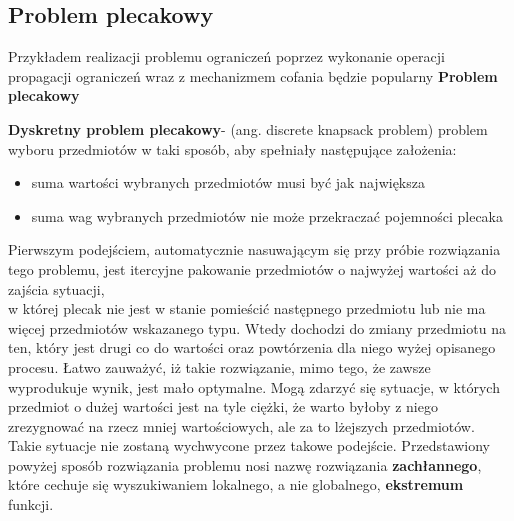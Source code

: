     \subsection{Problem plecakowy}
    Przykładem realizacji problemu ograniczeń poprzez wykonanie operacji propagacji ograniczeń wraz z mechanizmem cofania będzie popularny \textbf{Problem plecakowy}
    \begin{example}
        \textbf{Dyskretny problem plecakowy}- (ang. discrete knapsack problem) problem wyboru przedmiotów w taki sposób, aby spełniały następujące założenia:
        \begin{itemize}
            \item suma wartości wybranych przedmiotów musi być jak największa 
            \item suma wag wybranych przedmiotów nie może przekraczać pojemności plecaka
        \end{itemize}
    \end{example}

    Pierwszym podejściem, automatycznie nasuwającym się przy próbie rozwiązania tego problemu, 
    jest itercyjne pakowanie przedmiotów o najwyżej wartości aż do zajścia
    sytuacji, \\
    w której plecak nie jest w stanie pomieścić następnego przedmiotu lub nie ma więcej przedmiotów wskazanego typu. 
    Wtedy dochodzi do zmiany przedmiotu na ten, który jest 
    drugi co do wartości oraz powtórzenia dla niego wyżej opisanego procesu. Łatwo zauważyć, iż takie rozwiązanie, mimo tego, że zawsze wyprodukuje 
    wynik, jest mało optymalne. Mogą zdarzyć się sytuacje, w których przedmiot o dużej wartości jest na tyle ciężki, że warto byłoby z niego 
    zrezygnować na rzecz mniej wartościowych, ale za to lżejszych przedmiotów. Takie sytuacje nie zostaną wychwycone przez takowe podejście. 
    Przedstawiony powyżej sposób rozwiązania problemu nosi nazwę rozwiązania \textbf{zachłannego}, które cechuje się wyszukiwaniem lokalnego, a
    nie globalnego, \textbf{ekstremum} funkcji.

